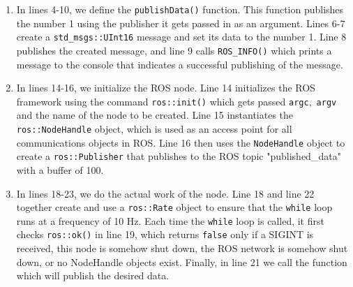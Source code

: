 \documentclass[11pt, twoside, pdftex]{article}
\begin{document}
\begin{enumerate}
	\item In lines 4-10, we define the \lstinline|publishData()| function. This function publishes the number 1 using the publisher it gets passed in as an argument. Lines 6-7 create a \lstinline|std_msgs::UInt16| message and set its data to the number 1. Line 8 publishes the created message, and line 9 calls \lstinline|ROS_INFO()| which prints a message to the console that indicates a successful publishing of the message.
	\item In lines 14-16, we initialize the ROS node. Line 14 initializes the ROS framework using the command \lstinline|ros::init()| which gets passed \lstinline|argc|,~\lstinline|argv| and the name of the node to be created. Line 15 instantiates the \lstinline|ros::NodeHandle| object, which is used as an access point for all communications objects in ROS. Line 16 then uses the \lstinline|NodeHandle| object to create a \lstinline|ros::Publisher| that publishes to the ROS topic "published\_data" with a buffer of 100.
	\item In lines 18-23, we do the actual work of the node. Line 18 and line 22 together create and use a \lstinline|ros::Rate| object to ensure that the \lstinline|while| loop runs at a frequency of 10 Hz. Each time the \lstinline|while| loop is called, it first checks \lstinline|ros::ok()| in line 19, which returns \lstinline|false| only if a SIGINT is received, this node is somehow shut down, the ROS network is somehow shut down, or no  NodeHandle objects exist. Finally, in line 21 we call the function which will publish the desired data.
\end{enumerate}
\end{document}
